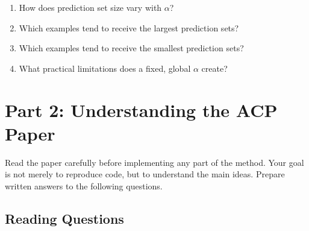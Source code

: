\documentclass[11pt]{article}
\begin{document}
\begin{enumerate}[label=\arabic*.]
  \item How does prediction set size vary with $\alpha$?
  \item Which examples tend to receive the largest prediction sets?
  \item Which examples tend to receive the smallest prediction sets?
  \item What practical limitations does a fixed, global $\alpha$ create?
\end{enumerate}

\section{Part 2: Understanding the ACP Paper}

Read the paper carefully before implementing any part of the method. Your
goal is not merely to reproduce code, but to understand the main ideas.
Prepare written answers to the following questions.

\subsection{Reading Questions}
\end{document}
